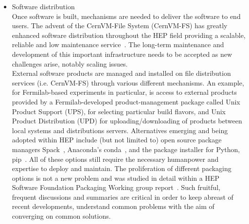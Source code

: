 \begin{itemize}
  \item Software distribution\\
Once software is built, mechanisms are needed to deliver the software to end users. The advent of the CernVM-File System (CernVM-FS) has greatly enhanced software distribution throughout the HEP field providing a scalable, reliable and low maintenance service~\cite{HEPSoftwareFoundation:2020daq}. The long-term maintenance and development of this important infrastructure needs to be accepted as new challenges arise, notably scaling issues. \\
External software products are managed and installed on file distribution services (i.e. CernVM-FS) through various different mechanisms. An example, for Fermilab-based experiments in particular, is access to external
products provided by a Fermilab-developed product-management package called Unix Product
Support (UPS), for selecting particular build flavors, and Unix Product Distribution (UPD) for uploading/downloading of products between local systems and distributions servers. Alternatives emerging and being adopted within HEP include (but not limited to) open source package managers Spack~\cite{7832814}, Anaconda's conda~\cite{anaconda}, and the package installer for Python, pip~\cite{pypi}. All of these options still require the necessary humanpower and expertise to deploy and maintain. 
The proliferation of different packaging options is not a new problem and was studied in detail within a HEP Software Foundation Packaging Working group report~\cite{l_sexton_kennedy_2016_1472340}. Such fruitful, frequent discussions and summaries are critical in order to keep abreast of recent developments, understand common problems with the aim of converging on common solutions. 


\end{itemize}

